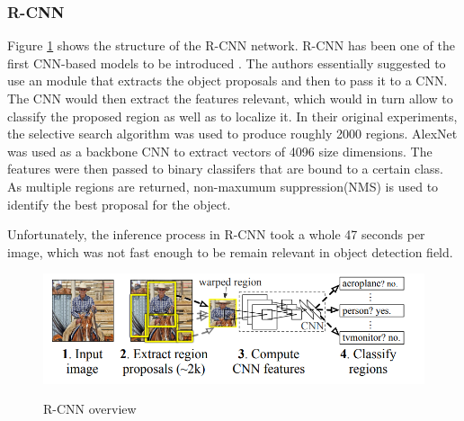\documentclass[english, 12pt, a4paper, elec, utf8, a-1b, online]{aaltothesis}
\begin{document}
\subsubsection{R-CNN}

Figure \ref{rcnn} shows the structure of the R-CNN network\cite{Girshick2013}. R-CNN has been one of the first CNN-based models to be introduced \cite{Zaidi2021}. The authors essentially suggested to use an module that extracts the object proposals and then to pass it to a CNN. The CNN would then extract the features relevant, which would in turn allow to classify the proposed region as well as to localize it. In their original experiments, the selective search algorithm \cite{Uijlings13} was used to produce roughly 2000 regions. AlexNet \cite{NIPS2012_c399862d} was used as a backbone CNN to extract vectors of 4096 size dimensions. The features were then passed to binary classifers that are bound to a certain class. As multiple regions are returned, non-maxumum suppression(NMS)\cite{Hosang2017}  is used to identify the best proposal for the object. 

Unfortunately, the inference process in R-CNN took a whole 47 seconds per image\cite{Girshick2013}, which was not fast enough to be remain relevant in object detection field. 

\begin{figure}[htb]
	\begin{center}
		\includegraphics[width=12cm]{./rcnn.png}
	\end{center}
	\caption{R-CNN overview\cite{Girshick2013}}
	\begin{center}
		\label{rcnn}
	\end{center}
\end{figure}
\end{document}
